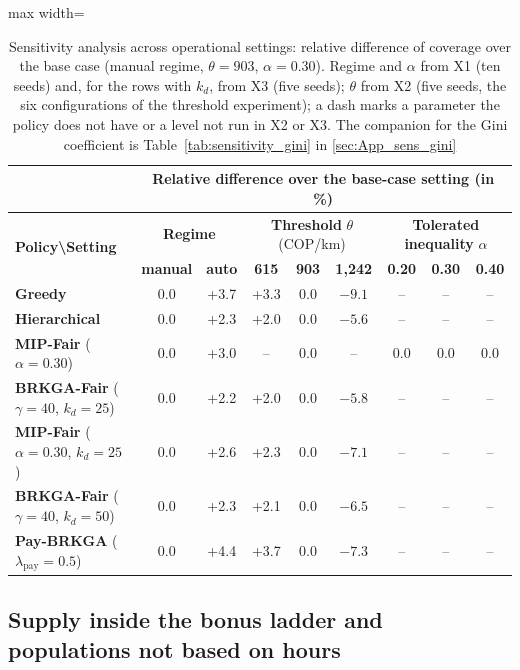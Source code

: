 \documentclass[a4paper,11pt,review,3p,authoryear]{elsarticle}
\begin{document}
\begin{table}[htbp]
\centering
\scriptsize
\begin{adjustbox}{max width=\textwidth}
\setlength{\tabcolsep}{4pt}
\renewcommand{\arraystretch}{1.15}
\begin{tabular}{l|cc|ccc|ccc}
\hline
\multicolumn{1}{c}{} & \multicolumn{8}{c}{\textbf{Relative difference over the base-case setting (in \%)}} \\
\hline
\multirow{2}{*}{\textbf{Policy\textbackslash Setting}}
& \multicolumn{2}{c|}{\textbf{Regime}}
& \multicolumn{3}{c|}{\textbf{Threshold} $\theta$ (COP/km)}
& \multicolumn{3}{c}{\textbf{Tolerated inequality} $\alpha$} \\
\cline{2-9}
& \textbf{manual} & \textbf{auto} & \textbf{615} & \textbf{903} & \textbf{1,242} & \textbf{0.20} & \textbf{0.30} & \textbf{0.40} \\
\hline
\textbf{Greedy} & 0.0 & +3.7 & +3.3 & 0.0 & $-9.1$ & -- & -- & -- \\
\textbf{Hierarchical} & 0.0 & +2.3 & +2.0 & 0.0 & $-5.6$ & -- & -- & -- \\
\textbf{MIP-Fair} ($\alpha = 0.30$) & 0.0 & +3.0 & -- & 0.0 & -- & 0.0 & 0.0 & 0.0 \\
\textbf{BRKGA-Fair} ($\gamma = 40$, $k_d = 25$) & 0.0 & +2.2 & +2.0 & 0.0 & $-5.8$ & -- & -- & -- \\
\textbf{MIP-Fair} ($\alpha = 0.30$, $k_d = 25$) & 0.0 & +2.6 & +2.3 & 0.0 & $-7.1$ & -- & -- & -- \\
\textbf{BRKGA-Fair} ($\gamma = 40$, $k_d = 50$) & 0.0 & +2.3 & +2.1 & 0.0 & $-6.5$ & -- & -- & -- \\
\textbf{Pay-BRKGA} ($\lambda_{\text{pay}} = 0.5$) & 0.0 & +4.4 & +3.7 & 0.0 & $-7.3$ & -- & -- & -- \\
\hline
\end{tabular}
\end{adjustbox}
\caption{Sensitivity analysis across operational settings: relative difference of coverage over the base case (manual regime, $\theta = 903$, $\alpha = 0.30$). Regime and $\alpha$ from X1 (ten seeds) and, for the rows with $k_d$, from X3 (five seeds); $\theta$ from X2 (five seeds, the six configurations of the threshold experiment); a dash marks a parameter the policy does not have or a level not run in X2 or X3. The companion for the Gini coefficient is Table~\ref{tab:sensitivity_gini} in \ref{sec:App_sens_gini}}
\label{tab:sensitivity}
\end{table}

\FloatBarrier
\subsection{Supply inside the bonus ladder and populations not based on hours}
\label{sec:App_objections}
\end{document}
